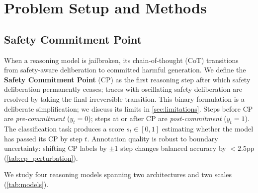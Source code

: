 \section{Problem Setup and Methods}
\label{sec:method}

\subsection{Safety Commitment Point}
\label{sec:commitment-point}

When a reasoning model is jailbroken, its chain-of-thought (CoT) transitions from safety-aware deliberation to committed harmful generation. We define the \textbf{Safety Commitment Point} (CP) as the first reasoning step after which safety deliberation permanently ceases; traces with oscillating safety deliberation are resolved by taking the final irreversible transition. This binary formulation is a deliberate simplification; we discuss its limits in \cref{sec:limitations}. Steps before CP are \emph{pre-commitment} ($y_t = 0$); steps at or after CP are \emph{post-commitment} ($y_t = 1$). The classification task produces a score $s_t \in [0, 1]$ estimating whether the model has passed its CP by step $t$. Annotation quality is robust to boundary uncertainty: shifting CP labels by $\pm$1 step changes balanced accuracy by ${<}2.5$pp (\cref{tab:cp_perturbation}).

We study four reasoning models spanning two architectures and two scales (\cref{tab:models}).

\begin{table}[t]
\centering
{}
\caption{Models studied. R1-8B and R1-32B are distilled from DeepSeek-R1~\citep{deepseekr1}; QwQ-32B~\citep{qwq} is a native reasoning model; OT-7B~\citep{openthinker} is trained with STILL~\citep{still} on Qwen2.5-7B. Data: HarmThoughts~\citep{harmthoughts} with step-level CP annotations (CP = first reasoning step after which safety deliberation permanently ceases). Split: 60/20/20.}
\label{tab:models}
\end{table}

